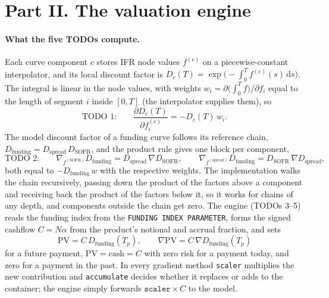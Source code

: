 \documentclass[11pt]{article}
\newcommand{\dd}{\mathrm{d}}
\begin{document}
\section*{Part II. The valuation engine}

\paragraph{What the five TODOs compute.}
Each curve component $c$ stores IFR node values $f^{(c)}$ on a piecewise-constant interpolator, and its local discount factor is $D_c(T)=\exp\bigl(-\int_0^T f^{(c)}(s)\,\dd s\bigr)$. The integral is linear in the node values, with weights $w_i=\partial\bigl(\int_0^Tf\bigr)/\partial f_i$ equal to the length of segment $i$ inside $[0,T]$ (the interpolator supplies them), so
\[
\text{TODO 1:}\qquad \frac{\partial D_c(T)}{\partial f^{(c)}_i}=-D_c(T)\,w_i .
\]
The model discount factor of a funding curve follows its reference chain, $D_{\mathrm{funding}}=D_{\mathrm{spread}}\,D_{\mathrm{SOFR}}$, and the product rule gives one block per component,
\[
\text{TODO 2:}\qquad
\nabla_{f^{(\mathrm{SOFR})}}D_{\mathrm{funding}}=D_{\mathrm{spread}}\,\nabla D_{\mathrm{SOFR}},
\qquad
\nabla_{f^{(\mathrm{spread})}}D_{\mathrm{funding}}=D_{\mathrm{SOFR}}\,\nabla D_{\mathrm{spread}},
\]
both equal to $-D_{\mathrm{funding}}\,w$ with the respective weights. The implementation walks the chain recursively, passing down the product of the factors above a component and receiving back the product of the factors below it, so it works for chains of any depth, and components outside the chain get zero. The engine (TODOs 3--5) reads the funding index from the \texttt{FUNDING INDEX PARAMETER}, forms the signed cashflow $C=N\alpha$ from the product's notional and accrual fraction, and sets
\[
\mathrm{PV}=C\,D_{\mathrm{funding}}(T_p),\qquad \nabla\mathrm{PV}=C\,\nabla D_{\mathrm{funding}}(T_p)
\]
for a future payment, $\mathrm{PV}=\text{cash}=C$ with zero risk for a payment today, and zero for a payment in the past. In every gradient method \texttt{scaler} multiplies the new contribution and \texttt{accumulate} decides whether it replaces or adds to the container; the engine simply forwards $\texttt{scaler}\times C$ to the model.
\end{document}
